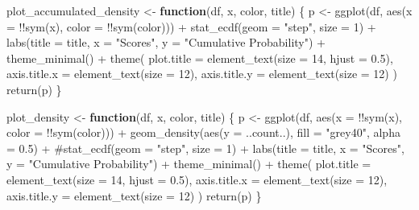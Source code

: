 \documentclass[
  letterpaper,
  DIV=11,
  numbers=noendperiod]{scrartcl}
\newenvironment{Shaded}{\begin{snugshade}}{\end{snugshade}}
\newcommand{\AttributeTok}[1]{\textcolor[rgb]{0.40,0.45,0.13}{#1}}
\newcommand{\CommentTok}[1]{\textcolor[rgb]{0.37,0.37,0.37}{#1}}
\newcommand{\ControlFlowTok}[1]{\textcolor[rgb]{0.00,0.23,0.31}{\textbf{#1}}}
\newcommand{\DecValTok}[1]{\textcolor[rgb]{0.68,0.00,0.00}{#1}}
\newcommand{\FloatTok}[1]{\textcolor[rgb]{0.68,0.00,0.00}{#1}}
\newcommand{\FunctionTok}[1]{\textcolor[rgb]{0.28,0.35,0.67}{#1}}
\newcommand{\NormalTok}[1]{\textcolor[rgb]{0.00,0.23,0.31}{#1}}
\newcommand{\OtherTok}[1]{\textcolor[rgb]{0.00,0.23,0.31}{#1}}
\newcommand{\SpecialCharTok}[1]{\textcolor[rgb]{0.37,0.37,0.37}{#1}}
\newcommand{\StringTok}[1]{\textcolor[rgb]{0.13,0.47,0.30}{#1}}
\begin{document}
\begin{Shaded}
\begin{Highlighting}[]
\NormalTok{plot\_accumulated\_density }\OtherTok{\textless{}{-}} \ControlFlowTok{function}\NormalTok{(df, x, color, title) \{}
\NormalTok{  p }\OtherTok{\textless{}{-}} \FunctionTok{ggplot}\NormalTok{(df, }\FunctionTok{aes}\NormalTok{(}\AttributeTok{x =} \SpecialCharTok{!!}\FunctionTok{sym}\NormalTok{(x), }\AttributeTok{color =} \SpecialCharTok{!!}\FunctionTok{sym}\NormalTok{(color))) }\SpecialCharTok{+}
    \FunctionTok{stat\_ecdf}\NormalTok{(}\AttributeTok{geom =} \StringTok{"step"}\NormalTok{, }\AttributeTok{size =} \DecValTok{1}\NormalTok{) }\SpecialCharTok{+}  
    \FunctionTok{labs}\NormalTok{(}\AttributeTok{title =}\NormalTok{ title, }\AttributeTok{x =} \StringTok{"Scores"}\NormalTok{, }\AttributeTok{y =} \StringTok{"Cumulative Probability"}\NormalTok{) }\SpecialCharTok{+}
    \FunctionTok{theme\_minimal}\NormalTok{() }\SpecialCharTok{+}
    \FunctionTok{theme}\NormalTok{(}
      \AttributeTok{plot.title =} \FunctionTok{element\_text}\NormalTok{(}\AttributeTok{size =} \DecValTok{14}\NormalTok{, }\AttributeTok{hjust =} \FloatTok{0.5}\NormalTok{),}
      \AttributeTok{axis.title.x =} \FunctionTok{element\_text}\NormalTok{(}\AttributeTok{size =} \DecValTok{12}\NormalTok{),}
      \AttributeTok{axis.title.y =} \FunctionTok{element\_text}\NormalTok{(}\AttributeTok{size =} \DecValTok{12}\NormalTok{)}
\NormalTok{    )}
  \FunctionTok{return}\NormalTok{(p)}
\NormalTok{\}}

\NormalTok{plot\_density }\OtherTok{\textless{}{-}} \ControlFlowTok{function}\NormalTok{(df, x, color, title) \{}
\NormalTok{  p }\OtherTok{\textless{}{-}} \FunctionTok{ggplot}\NormalTok{(df, }\FunctionTok{aes}\NormalTok{(}\AttributeTok{x =} \SpecialCharTok{!!}\FunctionTok{sym}\NormalTok{(x), }\AttributeTok{color =} \SpecialCharTok{!!}\FunctionTok{sym}\NormalTok{(color))) }\SpecialCharTok{+}
    \FunctionTok{geom\_density}\NormalTok{(}\FunctionTok{aes}\NormalTok{(}\AttributeTok{y =}\NormalTok{ ..count..), }\AttributeTok{fill =} \StringTok{"grey40"}\NormalTok{, }\AttributeTok{alpha =} \FloatTok{0.5}\NormalTok{) }\SpecialCharTok{+}
    \CommentTok{\#stat\_ecdf(geom = "step", size = 1) +  }
    \FunctionTok{labs}\NormalTok{(}\AttributeTok{title =}\NormalTok{ title, }\AttributeTok{x =} \StringTok{"Scores"}\NormalTok{, }\AttributeTok{y =} \StringTok{"Cumulative Probability"}\NormalTok{) }\SpecialCharTok{+}
    \FunctionTok{theme\_minimal}\NormalTok{() }\SpecialCharTok{+}
    \FunctionTok{theme}\NormalTok{(}
      \AttributeTok{plot.title =} \FunctionTok{element\_text}\NormalTok{(}\AttributeTok{size =} \DecValTok{14}\NormalTok{, }\AttributeTok{hjust =} \FloatTok{0.5}\NormalTok{),}
      \AttributeTok{axis.title.x =} \FunctionTok{element\_text}\NormalTok{(}\AttributeTok{size =} \DecValTok{12}\NormalTok{),}
      \AttributeTok{axis.title.y =} \FunctionTok{element\_text}\NormalTok{(}\AttributeTok{size =} \DecValTok{12}\NormalTok{)}
\NormalTok{    )}
  \FunctionTok{return}\NormalTok{(p)}
\NormalTok{\}}
\end{Highlighting}
\end{Shaded}
\end{document}
